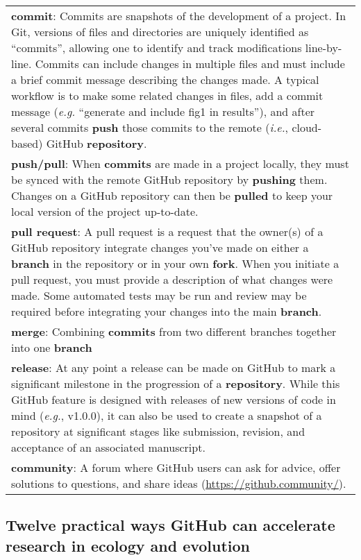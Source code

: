 \begin{tablenos:no-prefix-table-caption}
\begin{longtable}[]{@{}
  >{\raggedright\arraybackslash}p{}@{}}
\textbf{commit}: Commits are snapshots of the development of a project. In Git, versions of files and directories are uniquely identified as ``commits'', allowing one to identify and track modifications line-by-line. Commits can include changes in multiple files and must include a brief commit message describing the changes made. A typical workflow is to make some related changes in files, add a commit message (\emph{e.g.} ``generate and include fig1 in results''), and after several commits \textbf{push} those commits to the remote (\emph{i.e.}, cloud-based) GitHub \textbf{repository}. \\
\textbf{push/pull}: When \textbf{commits} are made in a project locally, they must be synced with the remote GitHub repository by \textbf{pushing} them. Changes on a GitHub repository can then be \textbf{pulled} to keep your local version of the project up-to-date. \\
\textbf{pull request}: A pull request is a request that the owner(s) of a GitHub repository integrate changes you've made on either a \textbf{branch} in the repository or in your own \textbf{fork}. When you initiate a pull request, you must provide a description of what changes were made. Some automated tests may be run and review may be required before integrating your changes into the main \textbf{branch}. \\
\textbf{merge}: Combining \textbf{commits} from two different branches together into one \textbf{branch} \\
\textbf{release}: At any point a release can be made on GitHub to mark a significant milestone in the progression of a \textbf{repository}. While this GitHub feature is designed with releases of new versions of code in mind (\emph{e.g.}, v1.0.0), it can also be used to create a snapshot of a repository at significant stages like submission, revision, and acceptance of an associated manuscript. \\
\textbf{community}: A forum where GitHub users can ask for advice, offer solutions to questions, and share ideas (\url{https://github.community/}). \\
\bottomrule
\end{longtable}

\end{tablenos:no-prefix-table-caption}

\hypertarget{twelve-practical-ways-github-can-accelerate-research-in-ecology-and-evolution}{%
\subsection{Twelve practical ways GitHub can accelerate research in ecology and evolution}\label{twelve-practical-ways-github-can-accelerate-research-in-ecology-and-evolution}}

